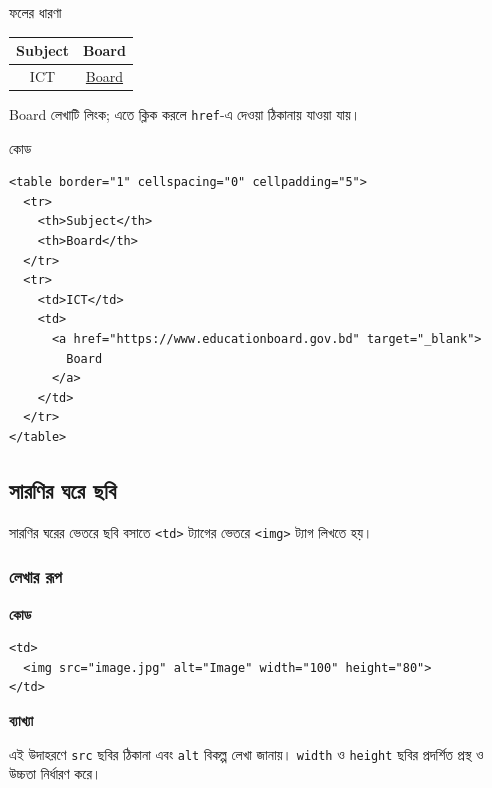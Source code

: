 \begin{examplebox}{ফলের ধারণা}
\begin{center}
\begin{tabular}{|c|c|}
\hline
\textbf{Subject} & \textbf{Board} \\
\hline
ICT & \underline{Board} \\
\hline
\end{tabular}
\end{center}
Board লেখাটি লিংক; এতে ক্লিক করলে \texttt{href}-এ দেওয়া ঠিকানায় যাওয়া যায়।
\end{examplebox}

\begin{examplebox}{কোড}
\begin{verbatim}
<table border="1" cellspacing="0" cellpadding="5">
  <tr>
    <th>Subject</th>
    <th>Board</th>
  </tr>
  <tr>
    <td>ICT</td>
    <td>
      <a href="https://www.educationboard.gov.bd" target="_blank">
        Board
      </a>
    </td>
  </tr>
</table>
\end{verbatim}
\end{examplebox}

\subsection{সারণির ঘরে ছবি}

সারণির ঘরের ভেতরে ছবি বসাতে \texttt{<td>} ট্যাগের ভেতরে \texttt{<img>} ট্যাগ লিখতে হয়।

\subsubsection{লেখার রূপ}

\par\noindent
\begin{minipage}[t]{.54\linewidth}\vspace{0pt}\small
\textbf{\color{chFourTeal}কোড}\par
\begin{verbatim}
<td>
  <img src="image.jpg" alt="Image" width="100" height="80">
</td>
\end{verbatim}
\par\smallskip
\end{minipage}\hfill
\begin{minipage}[t]{.42\linewidth}\vspace{0pt}\small
\textbf{\color{chFourTeal}ব্যাখ্যা}\par
এই উদাহরণে \texttt{src} ছবির ঠিকানা এবং \texttt{alt} বিকল্প লেখা জানায়। \texttt{width} ও \texttt{height} ছবির প্রদর্শিত প্রস্থ ও উচ্চতা নির্ধারণ করে।
\end{minipage}\par
